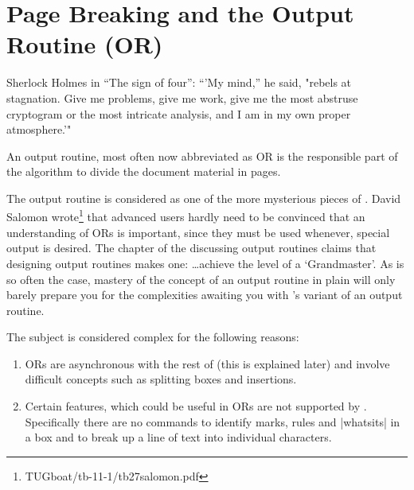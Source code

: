 \long{}
\chapter{Page Breaking and the Output Routine (OR)}
\label{ch:OTR}

\epigraph{Sherlock Holmes in ``The sign of four'': ``'My mind,'' he said, "rebels at stagnation. Give me problems, give me work, give me the most abstruse cryptogram or the most intricate analysis, and I am in my own proper atmosphere.'" }{}

An output routine, most often now abbreviated as OR is the responsible part of the \tex algorithm to divide the document
material in pages. 

The output routine is considered as one of the more mysterious pieces of \tex.
David Salomon wrote\footnote{TUGboat/tb-11-1/tb27salomon.pdf} that advanced users hardly need to be convinced that an understanding of ORs is important, since they must be used whenever, special output is desired.
The chapter of the \texbook discussing output routines claims that designing output routines makes one:
\ldots achieve the level of a `\tex Grandmaster'.
As is so often the case, mastery of the concept of an
output routine in plain \tex will only barely prepare you
for the complexities awaiting you with \latexe's variant of
an output routine.

The subject is considered complex for the following reasons:

\begin{enumerate}
\item ORs are asynchronous with the
rest of \tex (this is explained later) and involve difficult concepts such as splitting boxes and insertions.
\item Certain features, which could be useful in ORs are not supported by \tex. Specifically there are no commands to identify marks, rules and |whatsits| in a box and to break up a line of text into individual characters.
\end{enumerate}

